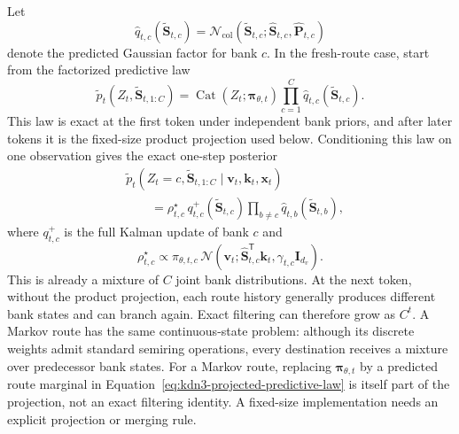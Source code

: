\documentclass[11pt]{article}
\newcommand{\ve}[1]{\boldsymbol{#1}}
\newcommand{\tr}{\mathsf{T}}
\newcommand{\Normal}{\mathcal{N}}
\newcommand{\Cat}{\operatorname{Cat}}
\begin{document}
Let
\begin{equation}
  \widehat q_{t,c}(\widetilde{\ve{S}}_{t,c})
  =
  \Normal_{\mathrm{col}}(
    \widetilde{\ve{S}}_{t,c};
    \widehat{\ve{S}}_{t,c},\widehat{\ve{P}}_{t,c})
  \label{eq:kdn3-bank-predictive-factor}
\end{equation}
denote the predicted Gaussian factor for bank $c$.  In the fresh-route case, start from the
factorized predictive law
\begin{equation}
  \widetilde p_t(
    Z_t,\widetilde{\ve{S}}_{t,1:C})
  =\Cat(Z_t;\ve{\pi}_{\theta,t})
   \prod_{c=1}^{C}\widehat q_{t,c}(\widetilde{\ve{S}}_{t,c}).
  \label{eq:kdn3-projected-predictive-law}
\end{equation}
This law is exact at the first token under independent bank priors, and after later tokens it is
the fixed-size product projection used below.  Conditioning this law on one observation gives the
exact one-step posterior
\begin{equation}
\begin{aligned}
  &\widetilde p_t(
    Z_t=c,\widetilde{\ve{S}}_{t,1:C}
    \mid\ve{v}_t,\ve{k}_t,\ve{x}_t)
  \\
  &\qquad=
  \rho_{t,c}^{\star}\,
  q_{t,c}^{+}(\widetilde{\ve{S}}_{t,c})
  \prod_{b\ne c}
  \widehat q_{t,b}(\widetilde{\ve{S}}_{t,b}),
\end{aligned}
  \label{eq:kdn3-exact-bank-posterior}
\end{equation}
where $q_{t,c}^{+}$ is the full Kalman update of bank $c$ and
\begin{equation}
  \rho_{t,c}^{\star}
  \propto
  \pi_{\theta,t,c}\,
  \Normal\!\left(
    \ve{v}_t;
    \widehat{\ve{S}}_{t,c}^{\tr}\ve{k}_t,
    \gamma_{t,c}\ve{I}_{d_v}
  \right).
  \label{eq:kdn3-collapsed-route-posterior}
\end{equation}
This is already a mixture of $C$ joint bank distributions.  At the next token, without the product
projection, each route history
generally produces different bank states and can branch again.  Exact filtering can therefore grow
as $C^t$.  A Markov route has the same continuous-state problem: although its discrete weights
admit standard semiring operations, every destination receives a mixture over predecessor bank
states.  For a Markov route, replacing $\ve{\pi}_{\theta,t}$ by a predicted route marginal in
Equation~\eqref{eq:kdn3-projected-predictive-law} is itself part of the projection, not an exact
filtering identity.  A fixed-size implementation needs an explicit projection or merging rule.
\end{document}
